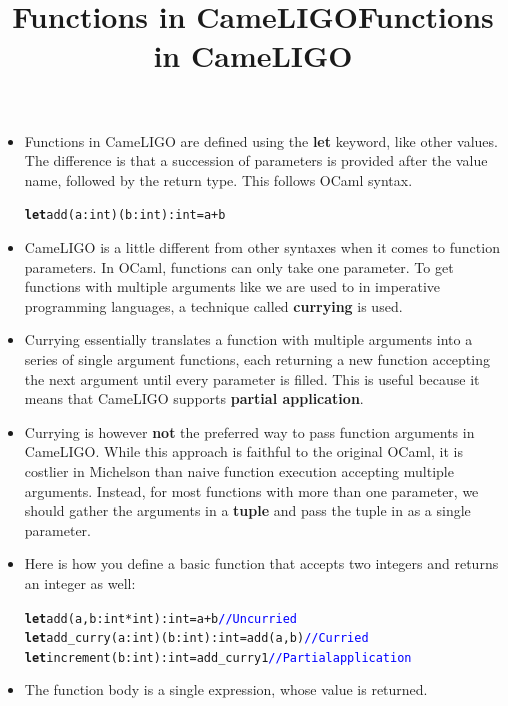 \documentclass[wide]{slides}
\newcommand{\Klet}[0]{\textbf{let}\xspace}
\newcommand{\com}[1]{\textcolor{blue}{{#1}}}
\begin{document}
\begin{slide}
  \title{Functions in CameLIGO}

  \begin{itemize}

    \item Functions in CameLIGO are defined using the \Klet keyword,
      like other values. The difference is that a succession of
      parameters is provided after the value name, followed by the
      return type. This follows OCaml syntax.
      \begin{alltt}
\Klet add (a : int) (b : int) : int = a + b
      \end{alltt}

    \item CameLIGO is a little different from other syntaxes when it
      comes to function parameters. In OCaml, functions can only take
      one parameter. To get functions with multiple arguments like we
      are used to in imperative programming languages, a technique
      called \textbf{currying} is used.

  \end{itemize}

\end{slide}

\begin{slide}
  \title{Functions in CameLIGO}

  \begin{itemize}

    \item Currying essentially translates a function with multiple
      arguments into a series of single argument functions, each
      returning a new function accepting the next argument until every
      parameter is filled. This is useful because it means that
      CameLIGO supports \textbf{partial application}.

    \item Currying is however \textbf{not} the preferred way to pass
      function arguments in CameLIGO.  While this approach is faithful
      to the original OCaml, it is costlier in Michelson than naive
      function execution accepting multiple arguments. Instead, for
      most functions with more than one parameter, we should gather
      the arguments in a \textbf{tuple} and pass the tuple in as a
      single parameter.

    \item Here is how you define a basic function that accepts two
      integers and returns an integer as well:
      \begin{alltt}
\Klet add (a, b : int * int) : int = a + b \com{// Uncurried}
\Klet add\_curry (a : int) (b : int) : int = add (a, b) \com{// Curried}
\Klet increment (b : int) : int = add\_curry 1 \com{// Partial application}
      \end{alltt}

    \item The function body is a single expression, whose value is
      returned.

  \end{itemize}

\end{slide}
\end{document}
